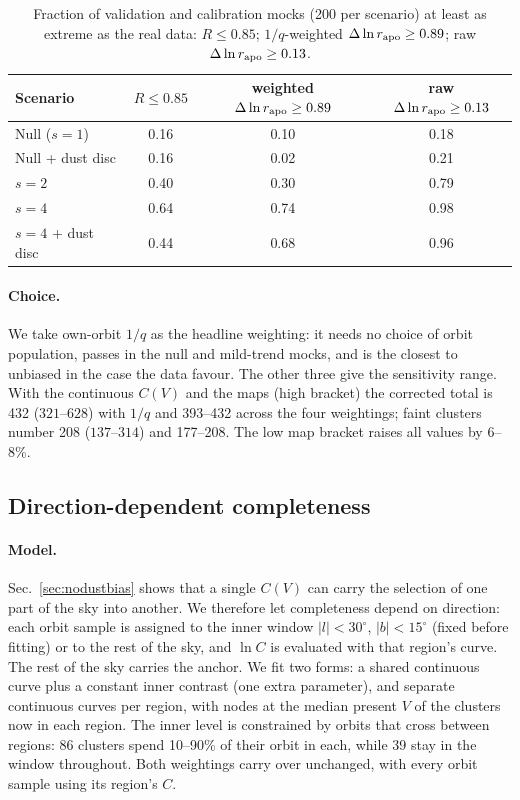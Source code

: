 \documentclass[11pt,a4paper]{article}
\begin{document}
\begin{table}[h]
\centering
\caption{Fraction of validation and calibration mocks (200 per scenario) at least as extreme as the real
data: $R\le0.85$; $1/q$-weighted $\Delta\ln r_{\rm apo}\ge0.89$; raw $\Delta\ln r_{\rm apo}\ge0.13$.}
\label{tab:faint_diag}
\small
\begin{tabular}{lccc}
\toprule
Scenario & $R\le0.85$ & weighted $\Delta\ln r_{\rm apo}\ge0.89$ & raw $\Delta\ln r_{\rm apo}\ge0.13$ \\
\midrule
Null ($s=1$) & 0.16 & 0.10 & 0.18 \\
Null + dust disc & 0.16 & 0.02 & 0.21 \\
$s=2$ & 0.40 & 0.30 & 0.79 \\
$s=4$ & 0.64 & 0.74 & 0.98 \\
$s=4$ + dust disc & 0.44 & 0.68 & 0.96 \\
\bottomrule
\end{tabular}
\end{table}

\paragraph{Choice.} We take own-orbit $1/q$ as the headline weighting: it needs no choice of orbit
population, passes in the null and mild-trend mocks, and is the closest to unbiased in the case the
data favour. The other three give the sensitivity range. With the continuous $C(V)$ and the maps
(high bracket) the corrected total is 432 ($321$--$628$) with $1/q$ and 393--432 across the four
weightings; faint clusters number 208 ($137$--$314$) and 177--208. The low map bracket raises all
values by 6--8\%.

\subsection{Direction-dependent completeness}
\label{sec:region}

\paragraph{Model.} Sec.~\ref{sec:nodustbias} shows that a single $C(V)$ can carry the selection of one
part of the sky into another. We therefore let completeness depend on direction: each orbit sample is
assigned to the inner window $|l|<30^\circ$, $|b|<15^\circ$ (fixed before fitting) or to the rest of
the sky, and $\ln C$ is evaluated with that region's curve. The rest of the sky carries the anchor. We
fit two forms: a shared continuous curve
plus a constant inner contrast (one extra parameter), and separate continuous curves per region, with
nodes at the median present $V$ of the clusters now in each region. The inner level is constrained by
orbits that cross between regions: 86 clusters spend 10--90\% of their orbit in each, while 39 stay
in the window throughout. Both weightings carry over unchanged, with every orbit sample using its
region's $C$.
\end{document}
